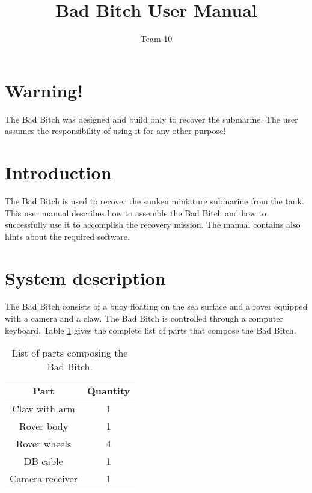 \documentclass[letterpaper, 12 pt]{article}
\begin{document}
\title{Bad Bitch User Manual}
\author{Team 10}
\maketitle
\pagestyle{empty}


\newpage
\vspace*{13cm}
\section*{Warning!}
The Bad Bitch was designed and build only to recover the submarine. The user assumes the responsibility of using it for any other purpose!

\newpage
\tableofcontents
\newpage

\section{Introduction}
The Bad Bitch is used to recover the sunken miniature submarine from the tank. This user manual describes how to assemble the Bad Bitch and how to successfully use it to accomplish the recovery mission. The manual contains also hints about the required software.
\section{System description}
The Bad Bitch consists of a buoy floating on the sea surface and a rover equipped with a camera and a claw. The Bad Bitch is controlled through a computer keyboard. Table \ref{tab:components} gives the complete list of parts that compose the Bad Bitch.
\begin{table}[h]
\begin{center}
\caption{List of parts composing the Bad Bitch.}
\label{tab:components}
\vspace{0.5cm}
\begin{tabular}{|c|c|}
\hline
\textbf{Part} & \textbf{Quantity}\\
\hline
Claw with arm & 1\\
\hline
Rover body & 1\\
\hline
Rover wheels & 4\\
\hline
DB cable & 1\\
\hline
Camera receiver & 1\\

\hline


\end{tabular}
\end{center}
\end{table}
\end{document}
